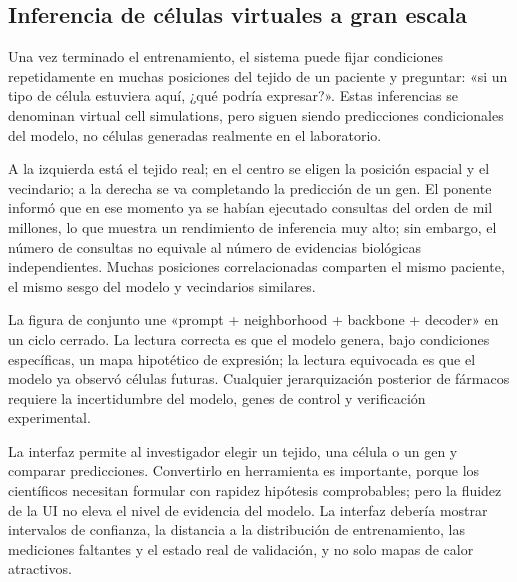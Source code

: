 \subsection{Inferencia de células virtuales a gran escala}

Una vez terminado el entrenamiento, el sistema puede fijar condiciones repetidamente en muchas posiciones del tejido de un paciente y preguntar: «si un tipo de célula estuviera aquí, ¿qué podría expresar?». Estas inferencias se denominan virtual cell simulations, pero siguen siendo predicciones condicionales del modelo, no células generadas realmente en el laboratorio.


A la izquierda está el tejido real; en el centro se eligen la posición espacial y el vecindario; a la derecha se va completando la predicción de un gen. El ponente informó que en ese momento ya se habían ejecutado consultas del orden de mil millones, lo que muestra un rendimiento de inferencia muy alto; sin embargo, el número de consultas no equivale al número de evidencias biológicas independientes. Muchas posiciones correlacionadas comparten el mismo paciente, el mismo sesgo del modelo y vecindarios similares.


La figura de conjunto une «prompt + neighborhood + backbone + decoder» en un ciclo cerrado. La lectura correcta es que el modelo genera, bajo condiciones específicas, un mapa hipotético de expresión; la lectura equivocada es que el modelo ya observó células futuras. Cualquier jerarquización posterior de fármacos requiere la incertidumbre del modelo, genes de control y verificación experimental.


La interfaz permite al investigador elegir un tejido, una célula o un gen y comparar predicciones. Convertirlo en herramienta es importante, porque los científicos necesitan formular con rapidez hipótesis comprobables; pero la fluidez de la UI no eleva el nivel de evidencia del modelo. La interfaz debería mostrar intervalos de confianza, la distancia a la distribución de entrenamiento, las mediciones faltantes y el estado real de validación, y no solo mapas de calor atractivos.

